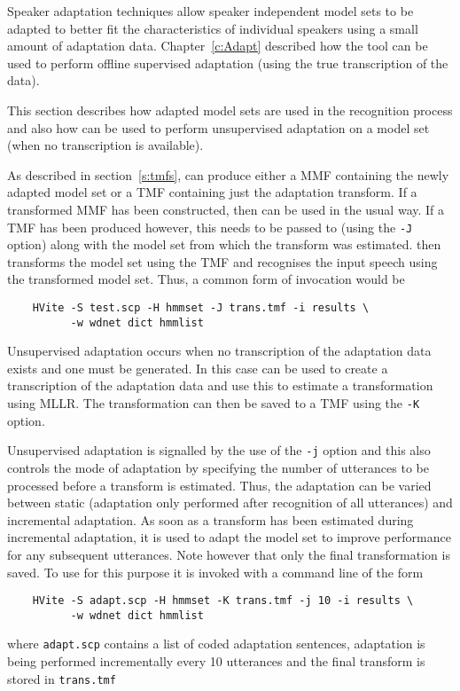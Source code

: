 
Speaker adaptation techniques allow speaker independent model 
sets to be adapted to better fit the characteristics of individual 
speakers using a small amount of adaptation data. 
Chapter~\ref{c:Adapt} described how the  tool can be 
used to perform offline supervised adaptation 
(using the true transcription of the data).  

This section describes how adapted model sets are used in 
the recognition process and also how  can be used to 
perform unsupervised adaptation on a model set 
(when no transcription is available).

As described in section~\ref{s:tmfs}, 
 can produce either a
MMF containing the newly adapted model set or a TMF containing just
the adaptation transform.
If a transformed MMF has been constructed, then 
can be used in the usual way. If a TMF has been produced however, 
this needs to be passed to 
 (using the \texttt{-J} option) along with the model set from 
which the transform was estimated.
 then transforms the model set using the TMF and recognises the
input speech using the transformed model set.
Thus, a common form of invocation would be
\begin{verbatim}
    HVite -S test.scp -H hmmset -J trans.tmf -i results \ 
          -w wdnet dict hmmlist
\end{verbatim} 


Unsupervised adaptation occurs when no transcription of the adaptation 
data exists and one must be generated. In this case \htool{HVite} can be used
to create a transcription of the adaptation data and use this to estimate a 
transformation using MLLR. The transformation can then be saved 
to a TMF using the \texttt{-K} option.

Unsupervised adaptation is signalled by the use of the \texttt{-j} 
option and this also controls the mode of adaptation by 
specifying the number of utterances to be processed before 
a transform is estimated. 
Thus, the adaptation can be varied between static (adaptation only performed 
after recognition of all utterances) and incremental adaptation.
As soon as a transform has been estimated during incremental adaptation, it is used 
to adapt the model set to improve performance for any subsequent utterances. 
Note however that only the final transformation is saved.
To use  for this purpose it is invoked with a command line of 
the form 
\begin{verbatim}
    HVite -S adapt.scp -H hmmset -K trans.tmf -j 10 -i results \ 
          -w wdnet dict hmmlist
\end{verbatim}
where \texttt{adapt.scp} contains a list of coded adaptation sentences, 
adaptation is being performed incrementally every 10 utterances and the final 
transform is stored in \texttt{trans.tmf} 

